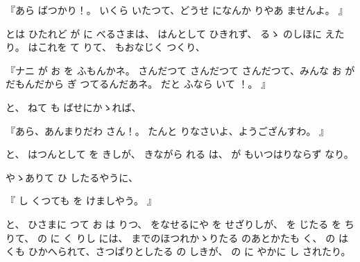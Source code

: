 
『あら
ばつかり！。
いくら
いたつて、どうせ
になんか
りやあ
ませんよ。
』

とは
ひたれど
が
に
べるさまは、
はんとして
ひきれず、
るゝ
のしほに
えたり。
はこれを
て
りて、
もおなじく
つくり、

『ナニ
が
お
を
ふもんかネ。
さんだつて
さんだつて
さんだつて、みんな
お
が
だもんだから
ぎ
つてるんだあネ。
だと
ふなら
いて
！。
』

と、
ねて
も
ばせにかゝれば、

『あら、あんまりだわ
さん！。
たんと
りなさいよ、ようござんすわ。
』

と、
はつんとして
を
きしが、
きながら
れる
は、
が
もいつはりならず
なり。

やゝありて
ひ
したるやうに、

『
し
くつても
を
けましやう。
』

と、
ひさまに
つて
お
は
りつ、
をなせるにや
を
せざりしが、
を
じたる
を
ち
りて、
の
に
く
りし
には、
までのほつれかゝりたる
のあとかたも
く、
の
は
くも
ひかへられて、さつぱりとしたる
の
しきが、
の
に
やかに
し
されたり。

